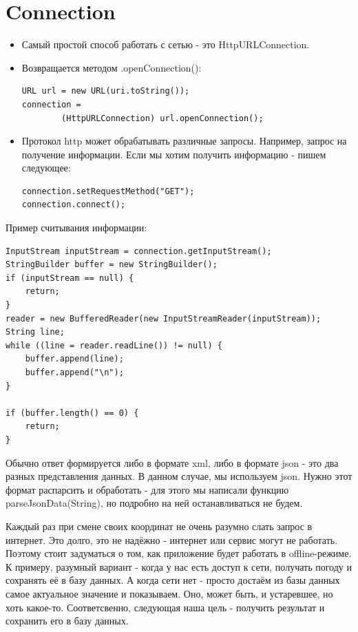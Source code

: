 \documentclass[12 pt]{article}
\begin{document}
\section{Connection}
    \begin{itemize}
        \item Самый простой способ работать с сетью - это HttpURLConnection.
        \item Возвращается методом .openConnection():
        \begin{lstlisting}
URL url = new URL(uri.toString());
connection = 
        (HttpURLConnection) url.openConnection();
        \end{lstlisting}
        \item Протокол http может обрабатывать различные запросы. Например, запрос на получение информации. Если мы хотим получить информацию - пишем следующее:
        \begin{lstlisting}
connection.setRequestMethod("GET");
connection.connect();
        \end{lstlisting}
    \end{itemize}
    Пример считывания информации:
    \begin{lstlisting}
InputStream inputStream = connection.getInputStream();
StringBuilder buffer = new StringBuilder();
if (inputStream == null) {
    return;
}
reader = new BufferedReader(new InputStreamReader(inputStream));
String line;
while ((line = reader.readLine()) != null) {
    buffer.append(line);
    buffer.append("\n");
}

if (buffer.length() == 0) {
    return;
}
    \end{lstlisting}
        Обычно ответ формируется либо в формате xml, либо в формате json - это два разных представления данных. В данном случае, мы используем json. Нужно этот формат распарсить и обработать - для этого мы написали функцию parseJsonData(String), но подробно на ней останавливаться не будем.
    
    Каждый раз при смене своих координат не очень разумно слать запрос в интернет. Это долго, это не надёжно - интернет или сервис могут не работать. Поэтому стоит задуматься о том, как приложение будет работать в offline-режиме. К примеру, разумный вариант - когда у нас есть доступ к сети, получать погоду и сохранять её в базу данных. А когда сети нет - просто достаём из базы данных самое актуальное значение и показываем. Оно, может быть, и устаревшее, но хоть какое-то. Соответсвенно, следующая наша цель - получить результат и сохранить его в базу данных.
\end{document}

